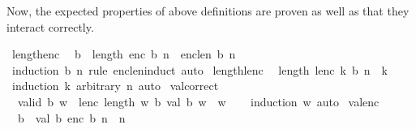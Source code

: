 \begin{isabellebody}
\isadelimdocument
%
\endisadelimdocument
%
\isatagdocument
%
\isamarkuptrue%
%
\endisatagdocument
{\isafolddocument}%
%
\isadelimdocument
%
\endisadelimdocument
%
\begin{isamarkuptext}%
Now, the expected properties of above definitions are proven as well as
  that they interact correctly.%
\end{isamarkuptext}\isamarkuptrue%
\isamarkupfalse%
\ length{\isacharunderscore}{\kern0pt}enc{\isacharcolon}{\kern0pt}\isanewline
\ \ {\isachardoublequoteopen}{}{\isasymle}b\ {\isasymLongrightarrow}\ length\ {\isacharparenleft}{\kern0pt}enc\ b\ n{\isacharparenright}{\kern0pt}\ {\isacharequal}{\kern0pt}\ enc{\isacharunderscore}{\kern0pt}len\ b\ n{\isachardoublequoteclose}\isanewline
%
\isadelimproof
\ \ %
\endisadelimproof
%
\isatagproof
{}\isamarkupfalse%
\ {\isacharparenleft}{\kern0pt}induction\ b\ n\ rule{\isacharcolon}{\kern0pt}\ enc{\isacharunderscore}{\kern0pt}len{\isachardot}{\kern0pt}induct{\isacharparenright}{\kern0pt}\ auto%
\endisatagproof
{\isafoldproof}%
%
\isadelimproof
\isanewline
%
\endisadelimproof
\isanewline
{}\isamarkupfalse%
\ length{\isacharunderscore}{\kern0pt}lenc{\isacharcolon}{\kern0pt}\isanewline
\ \ {\isachardoublequoteopen}length\ {\isacharparenleft}{\kern0pt}lenc\ k\ b\ n{\isacharparenright}{\kern0pt}\ {\isacharequal}{\kern0pt}\ k{\isachardoublequoteclose}\isanewline
%
\isadelimproof
\ \ %
\endisadelimproof
%
\isatagproof
{}\isamarkupfalse%
\ {\isacharparenleft}{\kern0pt}induction\ k\ arbitrary{\isacharcolon}{\kern0pt}\ n{\isacharparenright}{\kern0pt}\ auto%
\endisatagproof
{\isafoldproof}%
%
\isadelimproof
\isanewline
%
\endisadelimproof
\isanewline
{}\isamarkupfalse%
\ val{\isacharunderscore}{\kern0pt}correct{\isacharcolon}{\kern0pt}\isanewline
\ \ {\isachardoublequoteopen}valid\ b\ w\ {\isasymLongrightarrow}\ lenc\ {\isacharparenleft}{\kern0pt}length\ w{\isacharparenright}{\kern0pt}\ b\ {\isacharparenleft}{\kern0pt}val\ b\ w{\isacharparenright}{\kern0pt}\ {\isacharequal}{\kern0pt}\ w{\isachardoublequoteclose}\isanewline
%
\isadelimproof
\ \ %
\endisadelimproof
%
\isatagproof
{}\isamarkupfalse%
\ {\isacharparenleft}{\kern0pt}induction\ w{\isacharparenright}{\kern0pt}\ auto%
\endisatagproof
{\isafoldproof}%
%
\isadelimproof
\isanewline
%
\endisadelimproof
\isanewline
{}\isamarkupfalse%
\ val{\isacharunderscore}{\kern0pt}enc{\isacharcolon}{\kern0pt}\isanewline
\ \ {\isachardoublequoteopen}{}{\isasymle}b\ {\isasymLongrightarrow}\ val\ b\ {\isacharparenleft}{\kern0pt}enc\ b\ n{\isacharparenright}{\kern0pt}\ {\isacharequal}{\kern0pt}\ n{\isachardoublequoteclose}\isanewline

\end{isabellebody}
